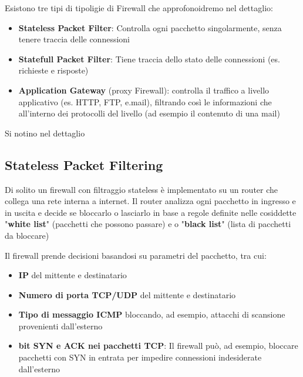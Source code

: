 Esistono tre tipi di tipoligie di Firewall che approfonoidremo nel dettaglio:
\begin{itemize}
    \item \textbf{Stateless Packet Filter}: Controlla ogni pacchetto singolarmente, senza tenere traccia delle connessioni
    \item \textbf{Statefull Packet Filter}: Tiene traccia dello stato delle connessioni (es. richieste e risposte)  
    \item \textbf{Application Gateway} (proxy Firewall): controlla il traffico a livello applicativo (es. HTTP, FTP, e.mail), filtrando così le informazioni che all'interno dei protocolli del livello (ad esempio il contenuto di una mail)
\end{itemize}

Si notino nel dettaglio
\subsection{Stateless Packet Filtering}

Di solito un firewall con filtraggio stateless è implementato su un router che collega una rete interna a internet. Il router analizza ogni pacchetto in ingresso e in uscita e decide se bloccarlo o lasciarlo in base a regole definite nelle cosiddette "\textbf{white list}" (pacchetti che possono passare) e o "\textbf{black list}" (lista di pacchetti da bloccare)

Il firewall prende decisioni basandosi su parametri del pacchetto, tra cui:
\begin{itemize}
    \item \textbf{IP} del mittente e destinatario
    \item \textbf{Numero di porta TCP/UDP} del mittente e destinatario
    \item \textbf{Tipo di messaggio ICMP} bloccando, ad esempio, attacchi di scansione provenienti dall'esterno
    \item \textbf{bit SYN e ACK nei pacchetti TCP}: Il firewall può, ad esempio, bloccare pacchetti con SYN in entrata per impedire connessioni indesiderate dall'esterno
\end{itemize}

